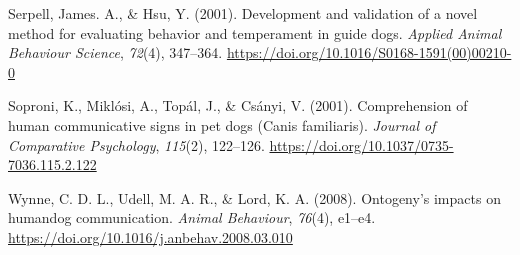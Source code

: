 \documentclass[
  pub,floatsintext]{apa6}
\newlength{\cslhangindent}
\newlength{\cslentryspacingunit} %
\newenvironment{CSLReferences}[2] %
 {%
  \setlength{\parindent}{0pt}
  \ifodd #1
  \let\oldpar\par
  \def\par{\hangindent=\cslhangindent\oldpar}
  \fi
  \setlength{\parskip}{#2\cslentryspacingunit}
 }%
 {}
\begin{document}
\begin{CSLReferences}{1}{0}
\leavevmode{}%
Serpell, James. A., \& Hsu, Y. (2001). Development and validation of a novel method for evaluating behavior and temperament in guide dogs. \emph{Applied Animal Behaviour Science}, \emph{72}(4), 347--364. \url{https://doi.org/10.1016/S0168-1591(00)00210-0}

\leavevmode{}%
Soproni, K., Miklósi, A., Topál, J., \& Csányi, V. (2001). Comprehension of human communicative signs in pet dogs ({Canis} familiaris). \emph{Journal of Comparative Psychology}, \emph{115}(2), 122--126. \url{https://doi.org/10.1037/0735-7036.115.2.122}

\leavevmode{}%
Wynne, C. D. L., Udell, M. A. R., \& Lord, K. A. (2008). Ontogeny's impacts on human{\textendash}dog communication. \emph{Animal Behaviour}, \emph{76}(4), e1--e4. \url{https://doi.org/10.1016/j.anbehav.2008.03.010}

\end{CSLReferences}
\end{document}
